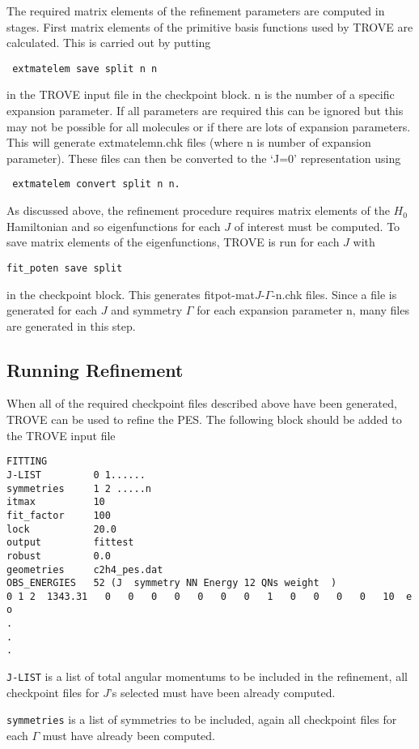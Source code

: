 The required matrix elements of the refinement parameters are computed in stages. First matrix elements of the primitive 
basis functions used by TROVE are calculated.
This is carried out by putting 
\begin{verbatim}
 extmatelem save split n n
\end{verbatim}
in the TROVE input file in the checkpoint block. n is the number of a specific expansion parameter. 
If all parameters are required this can be ignored but this may not 
be possible for all molecules or if there are lots of expansion parameters. 
This will generate extmatelemn.chk files (where n is number of expansion parameter). 
These files can then be converted to the `J=0' representation using 
\begin{verbatim}
 extmatelem convert split n n.
\end{verbatim}

As discussed above, the refinement procedure requires matrix elements of the $H_0$ Hamiltonian and so eigenfunctions for 
each $J$ of interest must be computed. To save matrix elements 
of the eigenfunctions, TROVE is run for each $J$ with 
\begin{verbatim}
fit_poten save split
\end{verbatim}
in the checkpoint block. This generates fitpot-mat$J$-$\Gamma$-n.chk files. Since a file is 
generated for each $J$ and symmetry $\Gamma$ for each expansion parameter 
n, many files are generated in this step. 


\subsection{Running Refinement}

When all of the required checkpoint files described above have been generated, TROVE can be used to refine the PES. The following block should be added to the TROVE input file
\begin{verbatim}
FITTING
J-LIST         0 1......
symmetries     1 2 .....n
itmax          10
fit_factor     100
lock           20.0
output         fittest
robust         0.0
geometries     c2h4_pes.dat
OBS_ENERGIES   52 (J  symmetry NN Energy 12 QNs weight  )
0 1 2  1343.31   0   0   0   0   0   0   0   1   0   0   0   0   10  e  o
.
.
.
\end{verbatim}
\verb|J-LIST| is a list of total angular momentums to be included in the refinement, all checkpoint files for $J$'s 
selected must have been already computed. 

\verb|symmetries| is a list of
symmetries to be included, again all checkpoint files for each $\Gamma$ must have already been computed. 

